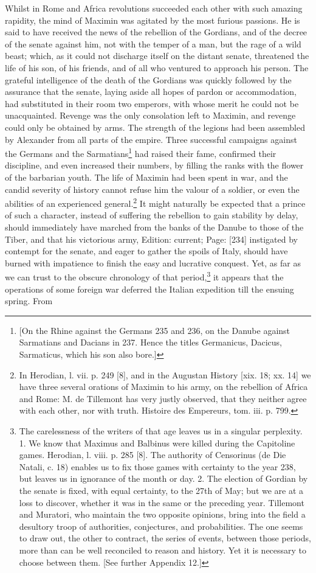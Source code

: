 Whilst in Rome and Africa revolutions succeeded each other with such amazing rapidity, the mind of Maximin was agitated by the most furious passions. He is said to have received the news of the rebellion of the Gordians, and of the decree of the senate against him, not with the temper of a man, but the rage of a wild beast; which, as it could not discharge itself on the distant senate, threatened the life of his son, of his friends, and of all who ventured to approach his person. The grateful intelligence of the death of the Gordians was quickly followed by the assurance that the senate, laying aside all hopes of pardon or accommodation, had substituted in their room two emperors, with whose merit he could not be unacquainted. Revenge was the only consolation left to Maximin, and revenge could only be obtained by arms. The strength of the legions had been assembled by Alexander from all parts of the empire. Three successful campaigns against the Germans and the Sarmatians\footnote{[On the Rhine against the Germans 235 and 236, on the Danube against Sarmatians and Dacians in 237. Hence the titles Germanicus, Dacicus, Sarmaticus, which his son also bore.]} had raised their fame, confirmed their discipline, and even increased their numbers, by filling the ranks with the flower of the barbarian youth. The life of Maximin had been spent in war, and the candid severity of history cannot refuse him the valour of a soldier, or even the abilities of an experienced general.\footnote{In Herodian, l. vii. p. 249 [8], and in the Augustan History [xix. 18; xx. 14] we have three several orations of Maximin to his army, on the rebellion of Africa and Rome: M. de Tillemont has very justly observed, that they neither agree with each other, nor with truth. Histoire des Empereurs, tom. iii. p. 799.} It might naturally be expected that a prince of such a character, instead of suffering the rebellion to gain stability by delay, should immediately have marched from the banks of the Danube to those of the Tiber, and that his victorious army, Edition: current; Page: [234] instigated by contempt for the senate, and eager to gather the spoils of Italy, should have burned with impatience to finish the easy and lucrative conquest. Yet, as far as we can trust to the obscure chronology of that period,\footnote{The carelessness of the writers of that age leaves us in a singular perplexity. 1. We know that Maximus and Balbinus were killed during the Capitoline games. Herodian, l. viii. p. 285 [8]. The authority of Censorinus (de Die Natali, c. 18) enables us to fix those games with certainty to the year 238, but leaves us in ignorance of the month or day. 2. The election of Gordian by the senate is fixed, with equal certainty, to the 27th of May; but we are at a loss to discover, whether it was in the same or the preceding year. Tillemont and Muratori, who maintain the two opposite opinions, bring into the field a desultory troop of authorities, conjectures, and probabilities. The one seems to draw out, the other to contract, the series of events, between those periods, more than can be well reconciled to reason and history. Yet it is necessary to choose between them. [See further Appendix 12.]} it appears that the operations of some foreign war deferred the Italian expedition till the ensuing spring. From 
